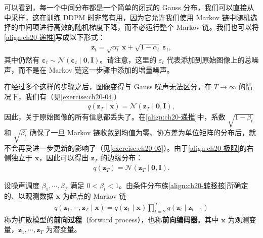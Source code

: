 \documentclass[../../main.tex]{subfiles}
\begin{document}
可以看到，每一个中间分布都是一个简单的闭式的 Gauss 分布，我们可以直接从中采样，这在训练 DDPM 时非常有用，因为它允许我们使用 Markov 链中随机选择的中间项进行高效的随机梯度下降，而不必运行整个 Markov 链。我们也可以将\eqref{align:ch20-递推}写成以下形式：
\begin{align}
\bm{z}_t=\sqrt{\alpha_t}\,\bm{x}+\sqrt{1-\alpha_t}\,\bm{\varepsilon}_t,
\label{align:ch20-直接采样}
\end{align}
其中仍然有 $\bm{\varepsilon}_t\sim\mathcal{N}(\bm{\varepsilon}_t\mid\bm{0},\bm{I})$。请注意，这里的 $\varepsilon_t$ 代表添加到原始图像上的总噪声，而不是在 Markov 链这一步骤中添加的增量噪声。

在经过多个这样的步骤之后，图像变得与 Gauss 噪声无法区分。在 $T\to\infty$ 的情况下，我们有（见\cref{exercise:ch20-04}）
\begin{align}
q(\bm{z}_T\mid\bm{x})=\mathcal{N}(\bm{z}_T\mid\bm{0},\bm{I}),
\label{align:ch20-极限}
\end{align}
因此，关于原始图像的所有信息都丢失了。在\eqref{align:ch20-递推}中，系数 $\sqrt{1-\beta_t}$ 和 $\sqrt{\beta_t}$ 确保了一旦 Markov 链收敛到均值为零、协方差为单位矩阵的分布后，就不会再受进一步更新的影响了（见\cref{exercise:ch20-05}）。由于\eqref{align:ch20-极限}的右侧独立于 $\bm{x}$，因此可以得出 $\bm{z}_T$ 的边缘分布：
\begin{align}
q(\bm{z}_T)=\mathcal{N}(\bm{z}_T\mid\bm{0},\bm{I}).
\label{align:ch20-边缘极限}
\end{align}

\begin{definition}[前向过程]\label{definition:ch20-前向过程}
设噪声调度 $\beta_1,\cdots,\beta_T$ 满足 $0<\beta_t<1$。由条件分布族\eqref{align:ch20-转移核}所确定的、以观测数据 $\bm{x}$ 为起点的 Markov 链
\begin{align*}
q(\bm{z}_1,\cdots,\bm{z}_T\mid\bm{x})=q(\bm{z}_1\mid\bm{x})\prod_{t=2}^{T}q(\bm{z}_t\mid\bm{z}_{t-1})
\end{align*}
称为扩散模型的\textbf{前向过程}（forward process），也称\textbf{前向编码器}。其中 $\bm{x}$ 为观测变量，$\bm{z}_1,\cdots,\bm{z}_T$ 为潜变量。
\end{definition}
\end{document}
